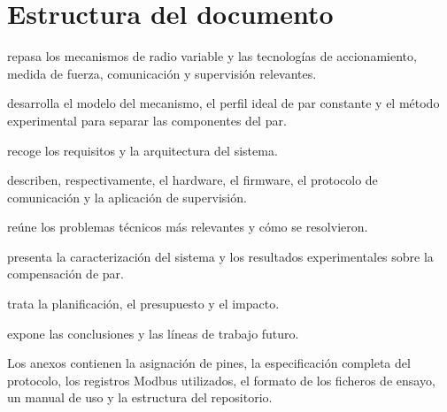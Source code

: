\section{Estructura del documento}

\begin{description}[style=nextline,leftmargin=2.2em]
  \item[Capítulo~\ref{chap:estado}] repasa los mecanismos de radio variable y las tecnologías de
        accionamiento, medida de fuerza, comunicación y supervisión relevantes.
  \item[Capítulo~\ref{chap:modelo}] desarrolla el modelo del mecanismo, el perfil ideal de par
        constante y el método experimental para separar las componentes del par.
  \item[Capítulo~\ref{chap:arquitectura}] recoge los requisitos y la arquitectura del sistema.
  \item[Capítulos~\ref{chap:hardware} a~\ref{chap:software}] describen, respectivamente, el hardware,
        el firmware, el protocolo de comunicación y la aplicación de supervisión.
  \item[Capítulo~\ref{chap:problemas}] reúne los problemas técnicos más relevantes y cómo se
        resolvieron.
  \item[Capítulo~\ref{chap:resultados}] presenta la caracterización del sistema y los resultados
        experimentales sobre la compensación de par.
  \item[Capítulo~\ref{chap:gestion}] trata la planificación, el presupuesto y el impacto.
  \item[Capítulo~\ref{chap:conclusiones}] expone las conclusiones y las líneas de trabajo futuro.
\end{description}

Los anexos contienen la asignación de pines, la especificación completa del protocolo, los
registros Modbus utilizados, el formato de los ficheros de ensayo, un manual de uso y la
estructura del repositorio.
